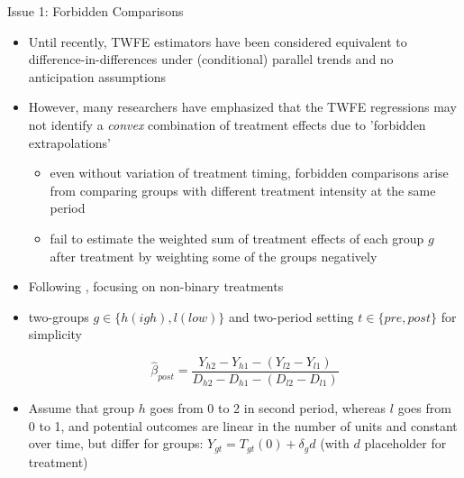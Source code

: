 \documentclass{beamer}
\begin{document}
\begin{frame}[allowframebreaks]{Issue 1: Forbidden Comparisons}

    \begin{itemize}
        \item Until recently, TWFE estimators have been considered equivalent to difference-in-differences under (conditional) parallel trends and no anticipation assumptions
        \item However, many researchers \citep{bib:callaway2021a,bib:dechaisemartin2020,bib:goodman-bacon2021} %
        have emphasized that the TWFE regressions may not identify a \textit{convex} combination of treatment effects due to 'forbidden extrapolations' \citep{bib:borusyak2021a}

        \begin{itemize}
            \item even without variation of treatment timing, forbidden comparisons arise from comparing groups with different treatment intensity at the same period
            \item fail to estimate the weighted sum of treatment effects of each group $g$ after treatment by weighting some of the groups negatively
        \end{itemize}

    \end{itemize}

    \framebreak
    
    \begin{itemize}
        \item Following \citet{bib:dechaisemartin2018}, focusing on non-binary treatments

        \item two-groups $g \in \{h(igh), l(low)\}$ and two-period setting $t \in \{pre, post\}$ for simplicity

        \begin{equation*}
            \hat{\beta}_{post} = \frac{Y_{h2} - Y_{h1} - (Y_{l2} - Y_{l1})}{D_{h2} - D_{h1} - (D_{l2} - D_{l1})}\tag{Wald-DID}\label{eq:walddid}
        \end{equation*}

    \end{itemize}

    \framebreak

    \begin{itemize}

        \item Assume that group $h$ goes from 0 to 2 in second period, whereas $l$ goes from 0 to 1, and potential outcomes are linear in the number of units and constant over time, but differ for groups: $Y_{gt} = T_{gt}(0) + \delta_{g}d$ (with $d$ placeholder for treatment)


\end{itemize}
\end{frame}
\end{document}
